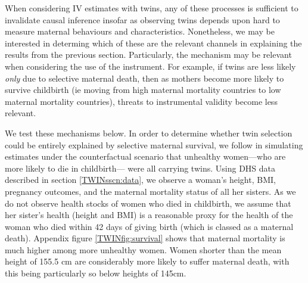 \documentclass[subeqn]{article}
\begin{document}
\begin{spacing}{1.4}
When considering IV estimates with twins, any of these processes is sufficient 
to invalidate causal inference insofar as observing twins depends upon hard 
to measure maternal behaviours and characteristics.  Nonetheless, we may be 
interested in determing which of these are the relevant channels in explaining 
the results from the previous section.  Particularly, the mechanism may be 
relevant when considering the use of the instrument.  For example, if twins are 
less likely \emph{only} due to selective maternal death, then as mothers become 
more likely to survive childbirth (ie moving from high maternal mortality 
countries to low maternal mortality countries), threats to instrumental validity 
become less relevant.

We test these mechanisms below.  In order to determine whether twin selection
could be entirely explained by selective maternal survival, we follow 
\citet{Aldermanetal2011} in simulating estimates under the counterfactual 
scenario that unhealthy women---who are more likely to die in childbirth---%
were all carrying twins. Using DHS data described in section 
\ref{TWINsscn:data}, we observe a woman's height, BMI, pregnancy outcomes, and 
the maternal mortality status of all her sisters.  As we do not observe health 
stocks of women who died in childbirth, we assume that her sister's health 
(height and BMI) is a reasonable proxy for the health of the woman who died 
within 42 days of giving birth (which is classed as a maternal death).  Appendix 
figure \ref{TWINfig:survival} shows that maternal mortality is much higher among 
more unhealthy women.  Women shorter than the mean height of 155.5 cm are 
considerably more likely to suffer maternal death, with this being particularly 
so below heights of 145cm.


\end{spacing}
\end{document}

